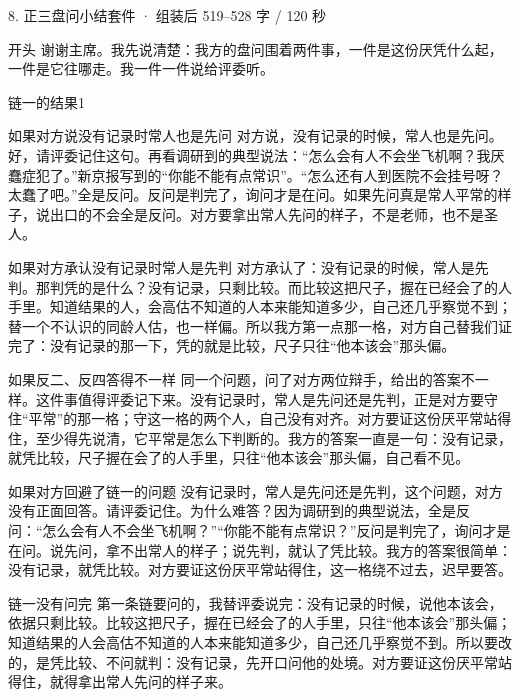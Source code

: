 \documentclass[script,pro]{debate}
\begin{document}
\begin{kit}{8. 正三盘问小结}{套件 · 组装后 519–528 字 / 120 秒}
\begin{fixed}{开头}
谢谢主席。我先说清楚：我方的盘问围着两件事，一件是这份厌凭什么起，一件是它往哪走。我一件一件说给评委听。
\end{fixed}
\begin{pick}{链一的结果}{1}
\begin{module}{如果对方说没有记录时常人也是先问}
对方说，没有记录的时候，常人也是先问。好，请评委记住这句。再看调研到的典型说法：“怎么会有人不会坐飞机啊？我厌蠢症犯了。”新京报写到的“你能不能有点常识”。“怎么还有人到医院不会挂号呀？太蠢了吧。”全是反问。反问是判完了，询问才是在问。如果先问真是常人平常的样子，说出口的不会全是反问。对方要拿出常人先问的样子，不是老师，也不是圣人。
\end{module}
\begin{module}{如果对方承认没有记录时常人是先判}
对方承认了：没有记录的时候，常人是先判。那判凭的是什么？没有记录，只剩比较。而比较这把尺子，握在已经会了的人手里。知道结果的人，会高估不知道的人本来能知道多少，自己还几乎察觉不到；替一个不认识的同龄人估，也一样偏。所以我方第一点那一格，对方自己替我们证完了：没有记录的那一下，凭的就是比较，尺子只往“他本该会”那头偏。
\end{module}
\begin{module}{如果反二、反四答得不一样}
同一个问题，问了对方两位辩手，给出的答案不一样。这件事值得评委记下来。没有记录时，常人是先问还是先判，正是对方要守住“平常”的那一格；守这一格的两个人，自己没有对齐。对方要证这份厌平常站得住，至少得先说清，它平常是怎么下判断的。我方的答案一直是一句：没有记录，就凭比较，尺子握在会了的人手里，只往“他本该会”那头偏，自己看不见。
\end{module}
\begin{module}{如果对方回避了链一的问题}
没有记录时，常人是先问还是先判，这个问题，对方没有正面回答。请评委记住。为什么难答？因为调研到的典型说法，全是反问：“怎么会有人不会坐飞机啊？”“你能不能有点常识？”反问是判完了，询问才是在问。说先问，拿不出常人的样子；说先判，就认了凭比较。我方的答案很简单：没有记录，就凭比较。对方要证这份厌平常站得住，这一格绕不过去，迟早要答。
\end{module}
\begin{fallback}{链一没有问完}
第一条链要问的，我替评委说完：没有记录的时候，说他本该会，依据只剩比较。比较这把尺子，握在已经会了的人手里，只往“他本该会”那头偏；知道结果的人会高估不知道的人本来能知道多少，自己还几乎察觉不到。所以要改的，是凭比较、不问就判：没有记录，先开口问他的处境。对方要证这份厌平常站得住，就得拿出常人先问的样子来。

\end{fallback}
\end{pick}
\end{kit}
\end{document}

